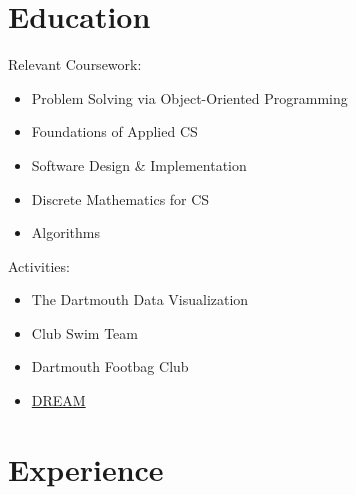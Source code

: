 \documentclass[11pt,a4paper,sans]{moderncv}
\begin{document}
\vspace*{-1.05mm}
\makecvtitle
\vspace*{-15mm}

\section{Education}

{}{Relevant Coursework:}
\vspace{-1.0em}\begin{small}
 \begin{multicols}{3}
    \begin{itemize}
\item Problem Solving via Object-Oriented Programming
\item Foundations of Applied CS
\item Software Design \& Implementation
\item Discrete Mathematics for CS
\item Algorithms

    \end{itemize}
    \end{multicols}\end{small}
    
{}{Activities:}
\vspace{-1.0em}\begin{small}
 \begin{multicols}{3}
    \begin{itemize}
\item The Dartmouth Data Visualization
\item Club Swim Team
\item Dartmouth Footbag Club
\item \href{https://www.dreamprogram.org/}{DREAM}

    \end{itemize}
    \end{multicols}\end{small}
    

\section{Experience}
\end{document}

